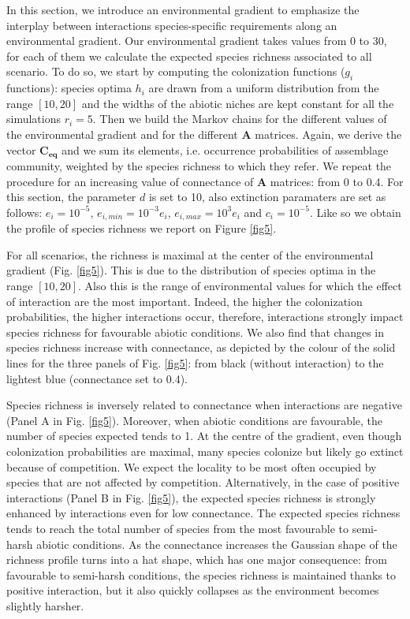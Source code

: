 In this section, we introduce an environmental gradient to emphasize the interplay between interactions species-specific requirements along an environmental gradient. Our environmental gradient takes values from 0 to 30, for each of them we calculate the expected species richness associated to all scenario. To do so, we start by computing the colonization functions ($g_i$ functions): species optima $h_i$ are drawn from a uniform distribution from the range $[10,20]$ and the widths of the abiotic niches are kept constant for all the simulations $r_i=5$. Then we build the Markov chains for the different values of the environmental gradient and for the different $\mathbf{A}$ matrices. Again, we derive the vector $\mathbf{C_{eq}}$ and we sum its elements, i.e. occurrence probabilities of assemblage community, weighted by the species richness to which they refer. We repeat the procedure for an increasing value of connectance of $\mathbf{A}$ matrices: from 0 to 0.4. For this section, the parameter $d$ is set to 10, also extinction paramaters are set as follows: $e_i=10^{-5}$, $e_{i,min}=10^{-3}e_i$, $e_{i,max}=10^{3}e_i$ and $c_i=10^{-5}$. Like so we obtain the profile of species richness we report on Figure \ref{fig5}.

For all scenarios, the richness is maximal at the center of the environmental gradient (Fig. \ref{fig5}). This is due to the distribution of species optima in the range $[10,20]$. Also this is the range of environmental values for which the effect of interaction are the most important. Indeed, the higher the colonization probabilities, the higher interactions occur, therefore, interactions strongly impact species richness for favourable abiotic conditions. We also find that changes in species richness increase with connectance, as depicted by the colour of the solid lines for the three panels of Fig. \ref{fig5}: from black (without interaction) to the lightest blue (connectance set to 0.4).

Species richness is inversely related to connectance when interactions are negative (Panel A in Fig. \ref{fig5}). Moreover, when abiotic conditions are favourable, the number of species expected tends to 1. At the centre of the gradient, even though colonization probabilities are maximal, many species colonize but likely go extinct because of competition. We expect the locality to be most often occupied by species that are not affected by competition. Alternatively, in the case of positive interactions (Panel B in Fig. \ref{fig5}), the expected species richness is strongly enhanced by interactions even for low connectance. The expected species richness tends to reach the total number of species from the most favourable to semi-harsh abiotic conditions. As the connectance increases the Gaussian shape of the richness profile turns into a hat shape, which has one major consequence: from favourable to semi-harsh conditions, the species richness is maintained thanks to positive interaction, but it also quickly collapses as the environment becomes slightly harsher.

